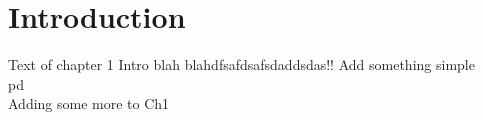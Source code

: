 \chapter{Introduction} \label{chapter:introduction}
Text of chapter 1 Intro blah blahdfsafdsafsdaddsdas!!
Add something simple\\pd\\
Adding some more to Ch1